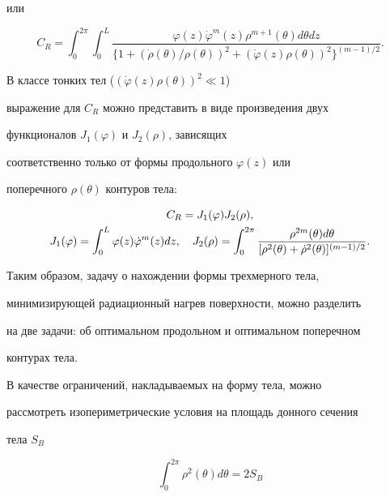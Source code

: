 или


$$


C_R =


\int_0^{2 \pi} \int_0^L


\frac {\varphi (z) \Dot{\varphi}^m (z)


\rho^{m+1} (\theta) d\theta dz}


{\{ 1 + ( \Dot{\rho} (\theta) / \rho(\theta) )^2 +


(\Dot{\varphi} (z) \rho (\theta))^2


\}^{(m-1)/2}}.


$$ 


В классе тонких тел ($(\Dot{\varphi} (z) \rho (\theta))^2 \ll 1$)


выражение для $C_R$ можно представить в виде произведения двух


функционалов $ J_1 (\varphi)$ и $J_2 (\rho)$, зависящих


соответственно только от формы продольного $\varphi (z)$ или


поперечного $\rho (\theta)$ контуров тела:


\begin{gather}


C_R = J_1 (\varphi) J_2 (\rho),\\


J_1 (\varphi) = \int_0^L \varphi (z) \Dot{\varphi}^m (z) dz,\quad


J_2 (\rho) = \int_0^{2 \pi} \frac {\rho^{2m} (\theta)


d\theta} {[ \rho^2 (\theta) + \Dot{\rho}^2 (\theta)


]^{(m-1)/2}}.\notag


\end{gather}


Таким образом, задачу о нахождении формы трехмерного тела,


минимизирующей радиационный нагрев поверхности, можно разделить


на две задачи: об оптимальном продольном и оптимальном поперечном


контурах тела.





В качестве ограничений, накладываемых на форму тела, можно


рассмотреть изопериметрические условия на площадь донного сечения


тела $S_B$


\begin{equation}


\int_0^{2 \pi} \rho^2 (\theta) d\theta = 2 S_B


\end{equation}


